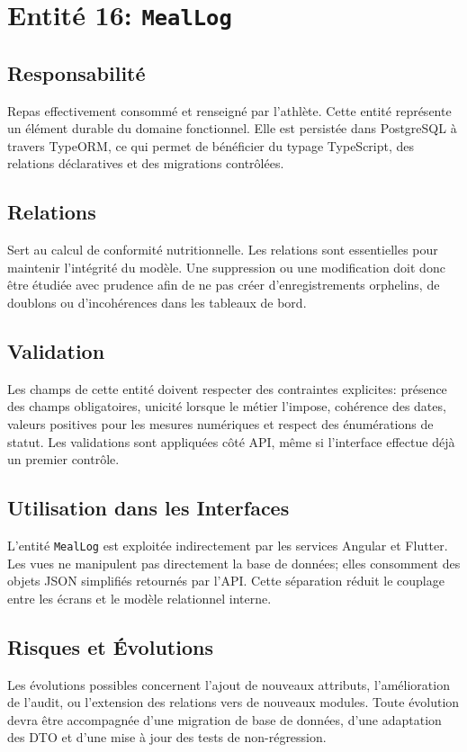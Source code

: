 \section{Entité 16: \texttt{MealLog}}
\subsection{Responsabilité}
Repas effectivement consommé et renseigné par l’athlète. Cette entité représente un élément durable du domaine fonctionnel. Elle est persistée dans PostgreSQL à travers TypeORM, ce qui permet de bénéficier du typage TypeScript, des relations déclaratives et des migrations contrôlées.

\subsection{Relations}
Sert au calcul de conformité nutritionnelle. Les relations sont essentielles pour maintenir l'intégrité du modèle. Une suppression ou une modification doit donc être étudiée avec prudence afin de ne pas créer d'enregistrements orphelins, de doublons ou d'incohérences dans les tableaux de bord.

\subsection{Validation}
Les champs de cette entité doivent respecter des contraintes explicites: présence des champs obligatoires, unicité lorsque le métier l'impose, cohérence des dates, valeurs positives pour les mesures numériques et respect des énumérations de statut. Les validations sont appliquées côté API, même si l'interface effectue déjà un premier contrôle.

\subsection{Utilisation dans les Interfaces}
L'entité \texttt{MealLog} est exploitée indirectement par les services Angular et Flutter. Les vues ne manipulent pas directement la base de données; elles consomment des objets JSON simplifiés retournés par l'API. Cette séparation réduit le couplage entre les écrans et le modèle relationnel interne.

\subsection{Risques et Évolutions}
Les évolutions possibles concernent l'ajout de nouveaux attributs, l'amélioration de l'audit, ou l'extension des relations vers de nouveaux modules. Toute évolution devra être accompagnée d'une migration de base de données, d'une adaptation des DTO et d'une mise à jour des tests de non-régression.

